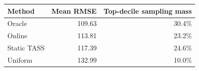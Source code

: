 \begin{tabular}{lrr}
\toprule
Method & Mean RMSE & Top-decile sampling mass \\
\midrule
Oracle & 109.63 & 30.4\% \\
Online & 113.81 & 23.2\% \\
Static TASS & 117.39 & 24.6\% \\
Uniform & 132.99 & 10.0\% \\
\bottomrule
\end{tabular}
